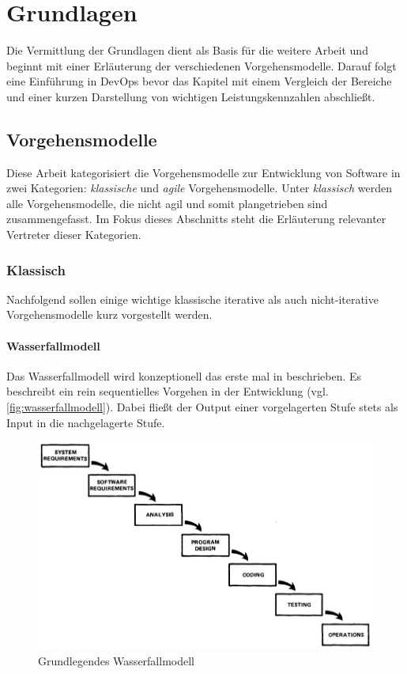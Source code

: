 \chapter{Grundlagen} %

Die Vermittlung der Grundlagen dient als Basis für die weitere Arbeit und beginnt mit einer Erläuterung der verschiedenen Vorgehensmodelle.
Darauf folgt eine Einführung in DevOps bevor das Kapitel mit einem Vergleich der Bereiche und einer kurzen Darstellung von wichtigen Leistungskennzahlen abschließt.

\section{Vorgehensmodelle} %

Diese Arbeit kategorisiert die Vorgehensmodelle zur Entwicklung von Software in zwei Kategorien: \emph{klassische} und \emph{agile} Vorgehensmodelle.
Unter \emph{klassisch} werden alle Vorgehensmodelle, die nicht agil und somit plangetrieben sind zusammengefasst.
Im Fokus dieses Abschnitts steht die Erläuterung relevanter Vertreter dieser Kategorien.

\subsection{Klassisch} %

Nachfolgend sollen einige wichtige klassische iterative als auch nicht-iterative Vorgehensmodelle kurz vorgestellt werden.

\subsubsection{Wasserfallmodell}

Das Wasserfallmodell wird konzeptionell das erste mal in \parencite[][]{Royce:1970aa} beschrieben.
Es beschreibt ein rein sequentielles Vorgehen in der Entwicklung (vgl. \autoref{fig:wasserfallmodell}). 
Dabei fließt der Output einer vorgelagerten Stufe stets als Input in die nachgelagerte Stufe.

\begin{figure}
  \centering
  \includegraphics[width=\textwidth]{img/wasserfallmodell.png}
  \caption{Grundlegendes Wasserfallmodell \parencite[][]{Royce:1970aa}}
  \label{fig:wasserfallmodell}
\end{figure}

